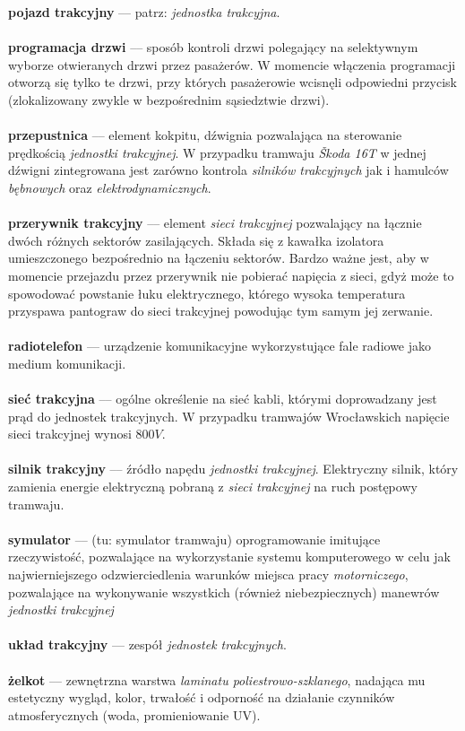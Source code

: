 \documentclass[12pt,a4paper]{article}
\begin{document}
{\bf pojazd trakcyjny} --– patrz: {\it jednostka trakcyjna}.\\\\
{\bf programacja drzwi} --– sposób kontroli drzwi polegający na selektywnym wyborze otwieranych drzwi
przez pasażerów. W momencie włączenia programacji otworzą się tylko te drzwi, przy
których pasażerowie wcisnęli odpowiedni przycisk (zlokalizowany zwykle w bezpośrednim sąsiedztwie
	drzwi).\\\\
{\bf przepustnica} --– element kokpitu, dźwignia pozwalająca na sterowanie prędkością {\it jednostki
trakcyjnej}. W przypadku tramwaju {\it Škoda 16T} w jednej dźwigni zintegrowana jest zarówno
kontrola {\it silników trakcyjnych} jak i hamulców {\it bębnowych} oraz {\it
elektrodynamicznych}.\\\\
{\bf przerywnik trakcyjny} --– element {\it sieci trakcyjnej} pozwalający na łącznie dwóch różnych
sektorów zasilających. Składa się z kawałka izolatora umieszczonego bezpośrednio na łączeniu
sektorów. Bardzo ważne jest, aby w momencie przejazdu przez przerywnik nie pobierać napięcia z
sieci, gdyż może to spowodować powstanie łuku elektrycznego, którego wysoka temperatura przyspawa
pantograw do sieci trakcyjnej powodując tym samym jej zerwanie.\\\\
{\bf radiotelefon} --– urządzenie komunikacyjne wykorzystujące fale radiowe jako medium komunikacji.\\\\
{\bf sieć trakcyjna} --– ogólne określenie na sieć kabli, którymi doprowadzany jest prąd do jednostek
trakcyjnych. W przypadku tramwajów Wrocławskich napięcie sieci trakcyjnej wynosi $800V$.\\\\
{\bf silnik trakcyjny} --– źródło napędu {\it jednostki trakcyjnej}. Elektryczny silnik, który
zamienia energie elektryczną pobraną z {\it sieci trakcyjnej} na ruch postępowy tramwaju.\\\\
{\bf symulator} --– (tu: symulator tramwaju) oprogramowanie imitujące rzeczywistość, pozwalające na 
wykorzystanie systemu komputerowego w celu jak najwierniejszego odzwierciedlenia warunków miejsca
pracy {\it motorniczego}, pozwalające na wykonywanie wszystkich (również niebezpiecznych) manewrów 
{\it jednostki trakcyjnej}\\\\
{\bf układ trakcyjny} --– zespół {\it jednostek trakcyjnych}.\\\\
{\bf żelkot} --– zewnętrzna warstwa {\it laminatu poliestrowo-szklanego}, nadająca mu
estetyczny wygląd, kolor, trwałość i odporność na działanie czynników
atmosferycznych (woda, promieniowanie UV).
\end{document}
